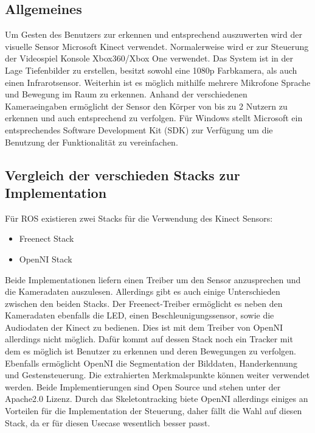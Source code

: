 \subsection{Allgemeines}
Um Gesten des Benutzers zur erkennen und entsprechend auszuwerten wird der visuelle Sensor Microsoft Kinect verwendet. Normalerweise wird er zur Steuerung der Videospiel Konsole Xbox360/Xbox One verwendet. Das System ist in der Lage Tiefenbilder zu erstellen, besitzt sowohl eine 1080p Farbkamera, als auch einen Infrarotsensor. Weiterhin ist es möglich mithilfe mehrere Mikrofone Sprache und Bewegung im Raum zu erkennen. Anhand der verschiedenen Kameraeingaben ermöglicht der Sensor den Körper von bis zu 2 Nutzern zu erkennen und auch entsprechend zu verfolgen. Für Windows stellt Microsoft ein entsprechendes Software Development Kit (SDK) zur Verfügung um die Benutzung der Funktionalität zu vereinfachen.\cite{kinectgolem} \cite{kinectms} \cite{kinectSDK}
\subsection{Vergleich der verschieden Stacks zur Implementation}
Für ROS existieren zwei Stacks für die Verwendung des Kinect Sensors:
\begin{itemize}
	\item Freenect Stack\cite{freenect}
	\item OpenNI Stack\cite{openni}
\end{itemize}
Beide Implementationen liefern einen Treiber um den Sensor anzusprechen und die Kameradaten auszulesen. Allerdings gibt es auch einige Unterschieden zwischen den beiden Stacks. Der Freenect-Treiber ermöglicht es neben den Kameradaten ebenfalls die LED, einen Beschleunigungssensor, sowie die Audiodaten der Kinect zu bedienen.\cite{freenect} Dies ist mit dem Treiber von OpenNI allerdings nicht möglich. Dafür kommt auf dessen Stack noch ein Tracker mit dem es möglich ist Benutzer zu erkennen und deren Bewegungen zu verfolgen. Ebenfalls ermöglicht OpenNI die Segmentation der Bilddaten, Handerkennung und Gestensteuerung. Die extrahierten Merkmalspunkte können weiter verwendet werden. Beide Implementierungen sind Open Source und stehen unter der Apache2.0 Lizenz\cite{opennilicense}\cite{freenect}. Durch das Skeletontracking biete OpenNI allerdings einiges an Vorteilen für die Implementation der Steuerung, daher fällt die Wahl auf diesen Stack, da er für diesen Usecase wesentlich besser passt.

